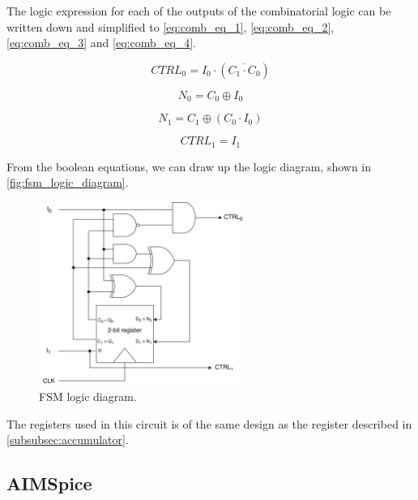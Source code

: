 \noindent
The logic expression for each of the outputs of the combinatorial logic can be written down and simplified to \autoref{eq:comb_eq_1}, \ref{eq:comb_eq_2}, \ref{eq:comb_eq_3} and \ref{eq:comb_eq_4}.

\begin{equation}
\label{eq:comb_eq_1}
    CTRL_0 = I_0\cdot(\overline{C_1 \cdot C_0})
\end{equation}

\begin{equation}
\label{eq:comb_eq_2}
    N_0 = C_0 \oplus I_0
\end{equation}

\begin{equation}
\label{eq:comb_eq_3}
    N_1 = C_1 \oplus (C_0 \cdot I_0)
\end{equation}

\begin{equation}
\label{eq:comb_eq_4}
    CTRL_1 = I_1
\end{equation}

From the boolean equations, we can draw up the logic diagram, shown in \autoref{fig:fsm_logic_diagram}.

\begin{figure}[H]
    \centering
    \includegraphics[width=0.6\textwidth]{Figures/logic diagram.png}
    \caption{FSM logic diagram.}
    \label{fig:fsm_logic_diagram}
\end{figure}

\noindent
The registers used in this circuit is of the same design as the register described in \autoref{subsubsec:accumulator}.

\subsection{AIMSpice}
\label{subsec:aimspicemethod}

